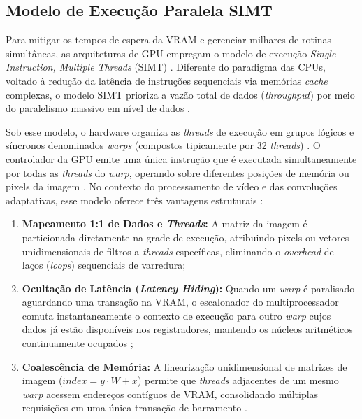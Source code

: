 \documentclass[
    12pt,                %
    openright,           %
    oneside,             %
    a4paper,             %
    english,             %
    brazil               %
]{abntex2}
\begin{document}
\subsection{Modelo de Execução Paralela SIMT}
\label{sec:modelo_simt}

Para mitigar os tempos de espera da VRAM e gerenciar milhares de rotinas simultâneas, as arquiteturas de GPU empregam o modelo de execução \textit{Single Instruction, Multiple Threads} (SIMT) \cite{Kirk2023}. Diferente do paradigma das CPUs, voltado à redução da latência de instruções sequenciais via memórias \textit{cache} complexas, o modelo SIMT prioriza a vazão total de dados (\textit{throughput}) por meio do paralelismo massivo em nível de dados \cite{Kirk2023, Hennessy2022}.

Sob esse modelo, o hardware organiza as \textit{threads} de execução em grupos lógicos e síncronos denominados \textit{warps} (compostos tipicamente por 32 \textit{threads}) \cite{Kirk2023, NvidiaCUDA2025}. O controlador da GPU emite uma única instrução que é executada simultaneamente por todas as \textit{threads} do \textit{warp}, operando sobre diferentes posições de memória ou pixels da imagem \cite{Kirk2023}. No contexto do processamento de vídeo e das convoluções adaptativas, esse modelo oferece três vantagens estruturais \cite{Gonzalez2009, Kirk2023}:

\begin{enumerate}
    \item \textbf{Mapeamento 1:1 de Dados e \textit{Threads}:} A matriz da imagem é particionada diretamente na grade de execução, atribuindo pixels ou vetores unidimensionais de filtros a \textit{threads} específicas, eliminando o \textit{overhead} de laços (\textit{loops}) sequenciais de varredura;
    \item \textbf{Ocultação de Latência (\textit{Latency Hiding}):} Quando um \textit{warp} é paralisado aguardando uma transação na VRAM, o escalonador do multiprocessador comuta instantaneamente o contexto de execução para outro \textit{warp} cujos dados já estão disponíveis nos registradores, mantendo os núcleos aritméticos continuamente ocupados \cite{Kirk2023};
    \item \textbf{Coalescência de Memória:} A linearização unidimensional de matrizes de imagem ($index = y \cdot W + x$) permite que \textit{threads} adjacentes de um mesmo \textit{warp} acessem endereços contíguos de VRAM, consolidando múltiplas requisições em uma única transação de barramento \cite{Kirk2023, NvidiaCUDA2025}.
\end{enumerate}
\end{document}
